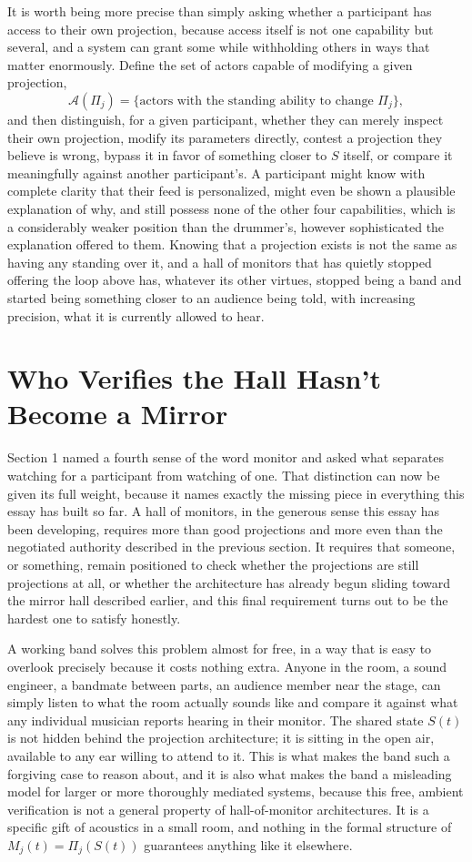\documentclass[12pt]{article}
\begin{document}
It is worth being more precise than simply asking whether a participant has access to their own projection, because access itself is not one capability but several, and a system can grant some while withholding others in ways that matter enormously. Define the set of actors capable of modifying a given projection,
\[
\mathcal{A}(\Pi_j) = \{\text{actors with the standing ability to change } \Pi_j\},
\]
and then distinguish, for a given participant, whether they can merely inspect their own projection, modify its parameters directly, contest a projection they believe is wrong, bypass it in favor of something closer to $S$ itself, or compare it meaningfully against another participant's. A participant might know with complete clarity that their feed is personalized, might even be shown a plausible explanation of why, and still possess none of the other four capabilities, which is a considerably weaker position than the drummer's, however sophisticated the explanation offered to them. Knowing that a projection exists is not the same as having any standing over it, and a hall of monitors that has quietly stopped offering the loop above has, whatever its other virtues, stopped being a band and started being something closer to an audience being told, with increasing precision, what it is currently allowed to hear.

\section{Who Verifies the Hall Hasn't Become a Mirror}

Section 1 named a fourth sense of the word monitor and asked what separates watching for a participant from watching of one. That distinction can now be given its full weight, because it names exactly the missing piece in everything this essay has built so far. A hall of monitors, in the generous sense this essay has been developing, requires more than good projections and more even than the negotiated authority described in the previous section. It requires that someone, or something, remain positioned to check whether the projections are still projections at all, or whether the architecture has already begun sliding toward the mirror hall described earlier, and this final requirement turns out to be the hardest one to satisfy honestly.

A working band solves this problem almost for free, in a way that is easy to overlook precisely because it costs nothing extra. Anyone in the room, a sound engineer, a bandmate between parts, an audience member near the stage, can simply listen to what the room actually sounds like and compare it against what any individual musician reports hearing in their monitor. The shared state $S(t)$ is not hidden behind the projection architecture; it is sitting in the open air, available to any ear willing to attend to it. This is what makes the band such a forgiving case to reason about, and it is also what makes the band a misleading model for larger or more thoroughly mediated systems, because this free, ambient verification is not a general property of hall-of-monitor architectures. It is a specific gift of acoustics in a small room, and nothing in the formal structure of $M_j(t) = \Pi_j(S(t))$ guarantees anything like it elsewhere.
\end{document}
